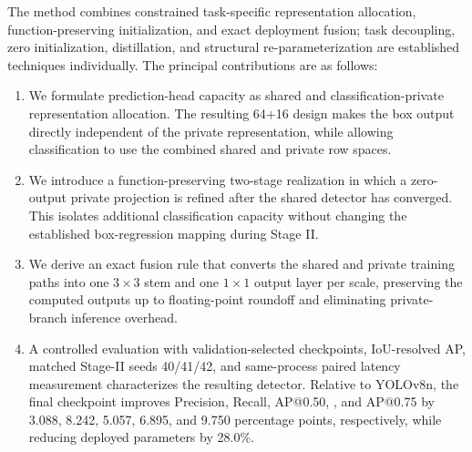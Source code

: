 The method combines constrained task-specific representation allocation, function-preserving initialization, and exact deployment fusion; task decoupling, zero initialization, distillation, and structural re-parameterization are established techniques individually. The principal contributions are as follows:
\begin{enumerate}
\item We formulate prediction-head capacity as shared and classification-private representation allocation. The resulting 64+16 design makes the box output directly independent of the private representation, while allowing classification to use the combined shared and private row spaces.
\item We introduce a function-preserving two-stage realization in which a zero-output private projection is refined after the shared detector has converged. This isolates additional classification capacity without changing the established box-regression mapping during Stage II.
\item We derive an exact fusion rule that converts the shared and private training paths into one $3\times3$ stem and one $1\times1$ output layer per scale, preserving the computed outputs up to floating-point roundoff and eliminating private-branch inference overhead.
\item A controlled evaluation with validation-selected checkpoints, IoU-resolved AP, matched Stage-II seeds 40/41/42, and same-process paired latency measurement characterizes the resulting detector. Relative to YOLOv8n, the final checkpoint improves Precision, Recall, AP@0.50, \mapall{}, and AP@0.75 by 3.088, 8.242, 5.057, 6.895, and 9.750 percentage points, respectively, while reducing deployed parameters by 28.0\%.
\end{enumerate}
